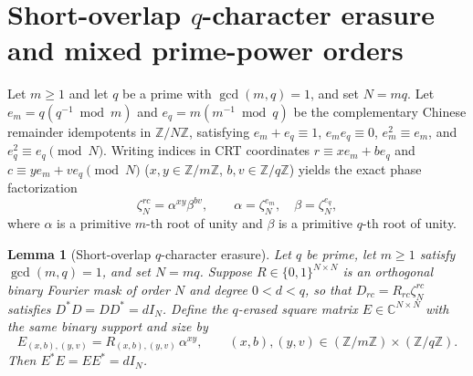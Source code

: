 \documentclass[11pt,reqno]{amsart}
\numberwithin{equation}{section}
\newtheorem{lemma}[theorem]{Lemma}
\theoremstyle{definition}
\theoremstyle{remark}
\newcommand{\C}{\mathbb{C}}
\newcommand{\Z}{\mathbb{Z}}
\begin{document}
\section{Short-overlap $q$-character erasure and mixed prime-power orders}
\label{sec:erasure}

Let $m\ge 1$ and let $q$ be a prime with $\gcd(m,q)=1$, and set $N=mq$. Let $e_m = q(q^{-1}\bmod m)$ and $e_q = m(m^{-1}\bmod q)$ be the complementary Chinese remainder idempotents in $\Z/N\Z$, satisfying $e_m+e_q\equiv 1$, $e_m e_q\equiv 0$, $e_m^2\equiv e_m$, and $e_q^2\equiv e_q\pmod N$. Writing indices in CRT coordinates $r\equiv x e_m + b e_q$ and $c\equiv y e_m + v e_q\pmod N$ ($x,y\in\Z/m\Z$, $b,v\in\Z/q\Z$) yields the exact phase factorization
\begin{equation}
\label{eq:crt-mq}
\zeta_N^{rc} = \alpha^{xy}\beta^{bv},\qquad \alpha=\zeta_N^{e_m},\quad \beta=\zeta_N^{e_q},
\end{equation}
where $\alpha$ is a primitive $m$-th root of unity and $\beta$ is a primitive $q$-th root of unity.

\begin{lemma}[Short-overlap $q$-character erasure]
\label{lem:erasure}
Let $q$ be prime, let $m\ge 1$ satisfy $\gcd(m,q)=1$, and set $N=mq$. Suppose $R\in\{0,1\}^{N\times N}$ is an orthogonal binary Fourier mask of order $N$ and degree $0<d<q$, so that $D_{rc}=R_{rc}\zeta_N^{rc}$ satisfies $D^*D=DD^*=dI_N$. Define the $q$-erased square matrix $E\in\C^{N\times N}$ with the same binary support and size by
\begin{equation}
\label{eq:erased-def}
E_{(x,b),(y,v)} = R_{(x,b),(y,v)}\,\alpha^{xy},\qquad (x,b),(y,v)\in(\Z/m\Z)\times(\Z/q\Z).
\end{equation}
Then $E^*E = EE^* = dI_N$.
\end{lemma}
\end{document}

